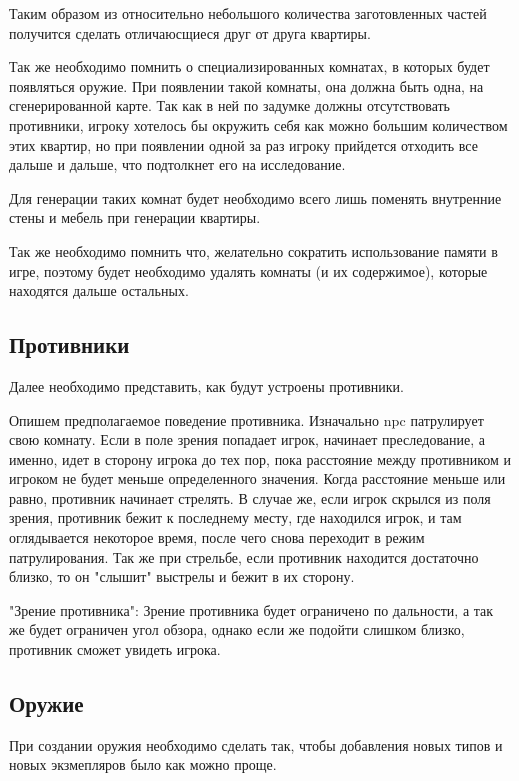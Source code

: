 \documentclass[14pt, titlepage,fleqn,a4paper]{extarticle}
\begin{document}
	Таким образом из относительно небольшого количества заготовленных частей получится сделать отличаюсщиеся друг от друга квартиры.
	
	Так же необходимо помнить о специализированных комнатах, в которых будет появляться оружие.
	При появлении такой комнаты, она должна быть одна, на сгенерированной карте. Так как в ней по задумке должны отсутствовать противники, игроку хотелось бы окружить себя как можно большим количеством этих квартир, но при появлении одной за раз игроку прийдется отходить все дальше и дальше, что подтолкнет его на исследование.
	
	Для генерации таких комнат будет необходимо всего лишь поменять внутренние стены и мебель при генерации квартиры.
	
	Так же необходимо помнить что, желательно сократить использование памяти в игре, поэтому будет необходимо удалять комнаты (и их содержимое), которые находятся дальше остальных.
	
	\subsection*{Противники}
	
	Далее необходимо представить, как будут устроены противники.
	
	Опишем предполагаемое поведение противника.
	Изначально npc патрулирует свою комнату. Если в поле зрения попадает игрок, начинает преследование, а именно, идет в сторону игрока до тех пор, пока расстояние  между противником и игроком не будет меньше определенного значения. Когда расстояние меньше или равно, противник начинает стрелять. В случае же, если игрок скрылся из поля зрения, противник бежит к последнему месту, где находился игрок, и там оглядывается некоторое время, после чего снова переходит в режим патрулирования. Так же при стрельбе, если противник находится достаточно близко, то он "слышит" выстрелы и бежит в их сторону.

    "Зрение противника":
    Зрение противника будет ограничено по дальности, а так же будет ограничен угол обзора, однако если же подойти слишком близко, противник сможет увидеть игрока.

    \subsection*{Оружие}
	
	При создании оружия необходимо сделать так, чтобы добавления новых типов и новых экзмепляров было как можно проще.
	
\end{document}
